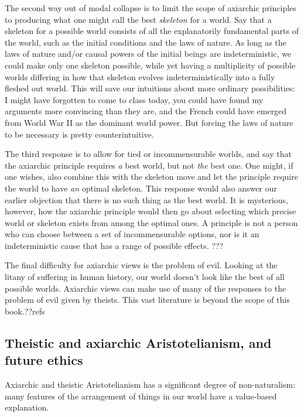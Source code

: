 The second way out of modal collapse is to limit the scope of axiarchic principles to producing what one might call the best 
\textit{skeleton} for a world. Say that a skeleton for a possible world consists of all the explanatorily fundamental parts
of the world, such as the initial conditions and the laws of nature. As long as the laws of nature and/or causal powers of 
the initial beings are indeterministic, we could make only one skeleton possible, while yet having a multiplicity of possible 
worlds differing in how that skeleton evolves indeterministically into a fully fleshed out world. This will save our intuitions
about more ordinary possibilities: I might have forgotten to come to class today, you could have found my arguments more convincing
than they are, and the French could have emerged from World War II as the dominant world power. But forcing the laws of nature to 
be necessary is pretty counterintuitive. 

The third response is to allow for tied or incommensurable worlds, and say that the axiarchic principle requires \textit{a} best world,
but not \textit{the} best one. One might, if one wishes, also combine this with the skeleton move and let the principle require the world
to have \textit{an} optimal skeleton. This response would also answer our earlier objection that there is no such thing as the best world.
It is mysterious, however, how the axiarchic principle would then go about selecting which precise world or skeleton exists from among the
optimal ones. A principle is not a person who can choose between a set of incommensurable options, nor is it an indeterministic cause that
has a range of possible effects. ???

The final difficulty for axiarchic views is the problem of evil. Looking at the litany of suffering in human history, 
our world doesn't look like the best of all possible worlds. Axiarchic views can make use of many of the responses to 
the problem of evil given by theists. This vast literature is beyond the scope of this book.??refs

\subsection{Theistic and axiarchic Aristotelianism, and future ethics}
Axiarchic and theistic Aristotelianism has a significant degree of non-naturalism: many features of the arrangement
of things in our world have a value-based explanation. 


